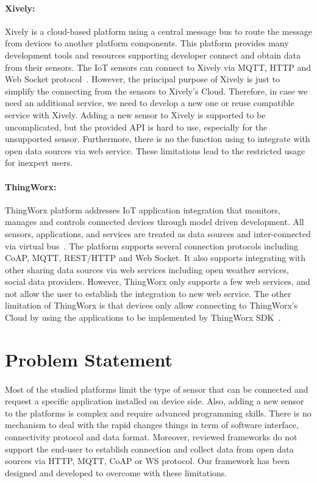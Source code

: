 \paragraph{Xively:}
Xively is a cloud-based platform using a central message bus to route the message from devices to another platform components. This platform provides many development tools and resources supporting developer connect and obtain data from their sensors. The IoT sensors can connect to Xively via MQTT, HTTP and Web Socket protocol~\cite{kohler2014platforms}. However, the principal purpose of Xively is just to simplify the connecting from the sensors to Xively’s Cloud. Therefore, in case we need an additional service, we need to develop a new one or reuse compatible service with Xively. Adding a new sensor to Xively is supported to be uncomplicated, but the provided API is hard to use, especially for the unsupported sensor. Furthermore, there is no the function using to integrate with open data sources via web service. These limitations lead to the restricted usage for inexpert users.

\paragraph{ThingWorx:}
ThingWorx platform addresses IoT application integration that monitors, manages and controls connected devices through model driven development. All sensors, applications, and services are treated as data sources and inter-connected via virtual bus~\cite{derhamy2015survey}. The platform supports several connection protocols including CoAP, MQTT, REST/HTTP and Web Socket. It also supports integrating with other sharing data sources via web services including open weather services, social data providers. However, ThingWorx only supports a few web services, and not allow the user to establish the integration to new web service. The other limitation of ThingWorx is that devices only allow connecting to ThingWorx’s Cloud by using the applications to be implemented by ThingWorx SDK~\cite{solutions25platform}.

\section{Problem Statement}
\paragraph{} Most of the studied platforms limit the type of sensor that can be connected and request a specific application installed on device side. Also, adding a new sensor to the platforms is complex and require advanced programming skills. There is no mechanism to deal with the rapid changes things in term of software interface, connectivity protocol and data format. Moreover, reviewed frameworks do not support the end-user to establish connection and collect data from open data sources via HTTP, MQTT, CoAP or WS protocol. Our framework has been designed and developed to overcome with these limitations.
